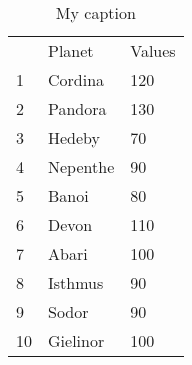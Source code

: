 \begin{table}[]
\centering
\caption{My caption}
\label{my-label}
\begin{tabular}{l|l|l|}
\cline{2-3}
 & \cellcolor[HTML]{FFCCC9}Planet & \cellcolor[HTML]{FFCCC9}Values \\ \cline{2-3} 
1 & \cellcolor[HTML]{CC66FF}Cordina & \cellcolor[HTML]{CC66FF}120 \\ \cline{2-3} 
2 & Pandora & 130 \\ \cline{2-3} 
3 & \cellcolor[HTML]{C6E0B4}Hedeby & \cellcolor[HTML]{C6E0B4}70 \\ \cline{2-3} 
4 & \cellcolor[HTML]{CC66FF}Nepenthe & \cellcolor[HTML]{CC66FF}90 \\ \cline{2-3} 
5 & Banoi & 80 \\ \cline{2-3} 
6 & \cellcolor[HTML]{C6E0B4}Devon & \cellcolor[HTML]{C6E0B4}110 \\ \cline{2-3} 
7 & Abari & 100 \\ \cline{2-3} 
8 & Isthmus & 90 \\ \cline{2-3} 
9 & \cellcolor[HTML]{F8CBAD}Sodor & \cellcolor[HTML]{F8CBAD}90 \\ \cline{2-3} 
10 & \cellcolor[HTML]{F8CBAD}Gielinor & \cellcolor[HTML]{F8CBAD}100 \\ \cline{2-3} 
\end{tabular}
\end{table}